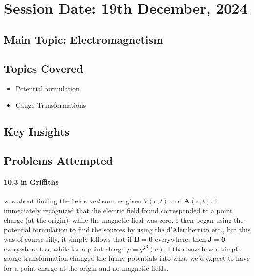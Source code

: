 \section{Session Date: 19th December, 2024}
\subsection*{Main Topic: Electromagnetism}
\subsection*{Topics Covered}
\begin{itemize}
    \item Potential formulation
    \item Gauge Transformations
\end{itemize}

\subsection*{Key Insights}
\subsection*{Problems Attempted}
\paragraph{10.3 in Griffiths} was about finding the fields \textit{and} sources given \(V(\mathbf{r}, t)\) and \(\mathbf{A}(\mathbf{r}, t)\). I immediately recognized that the electric field found corresponded to a point charge (at the origin), while the magnetic field was zero. I then began using the potential formulation to find the sources by using the d'Alembertian etc., but this was of course silly, it simply follows that if \(\mathbf{B} = \mathbf{0}\) everywhere, then \(\mathbf{J} = \mathbf{0}\) everywhere too, while for a point charge \(\rho = q \delta ^3 (\mathbf{r})\). I then saw how a simple gauge transformation changed the funny potentials into what we'd expect to have for a point charge at the origin and no magnetic fields.

